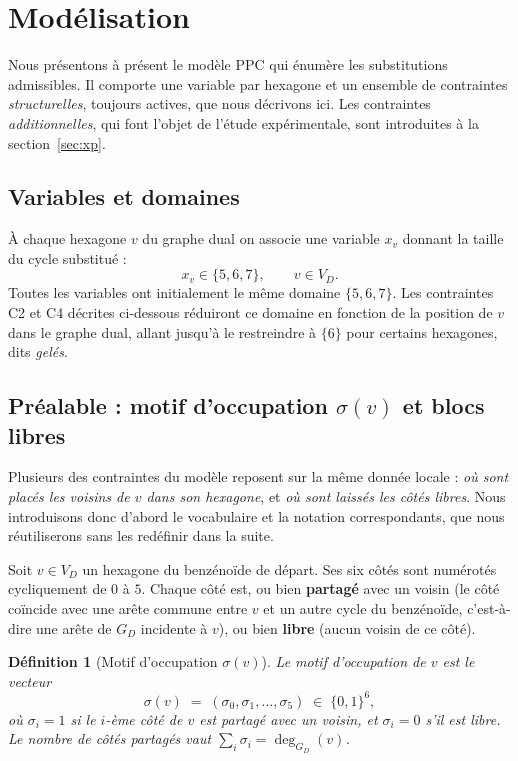 \documentclass[11pt,a4paper]{article}
\newcommand{\GD}{\ensuremath{G_D}}                 %
\newtheorem{definition}{Définition}
\begin{document}
\section{Modélisation}
\label{sec:modele}

Nous présentons à présent le modèle PPC qui énumère les substitutions
admissibles. Il comporte une variable par hexagone et un ensemble de contraintes
\emph{structurelles}, toujours actives, que nous décrivons ici. Les contraintes
\emph{additionnelles}, qui font l'objet de l'étude expérimentale, sont
introduites à la section~\ref{sec:xp}.

\subsection{Variables et domaines}

À chaque hexagone $v$ du graphe dual on associe une variable $x_v$ donnant
la taille du cycle substitué :
\[
  x_v \in \{5, 6, 7\}, \qquad v \in V_D.
\]
Toutes les variables ont initialement le même domaine $\{5, 6, 7\}$.
Les contraintes C2 et C4 décrites ci-dessous réduiront ce domaine
en fonction de la position de $v$ dans le graphe dual, allant jusqu'à
le restreindre à $\{6\}$ pour certains hexagones, dits \emph{gelés}.

\subsection{Préalable : motif d'occupation $\sigma(v)$ et blocs libres}
\label{sec:sigma}

Plusieurs des contraintes du modèle reposent sur la même donnée locale :
\emph{où sont placés les voisins de $v$ dans son hexagone}, et
\emph{où sont laissés les côtés libres}. Nous introduisons donc d'abord
le vocabulaire et la notation correspondants, que nous réutiliserons
sans les redéfinir dans la suite.

Soit $v \in V_D$ un hexagone du benzénoïde de départ. Ses six côtés sont
numérotés cycliquement de $0$ à $5$. Chaque côté est, ou bien
\textbf{partagé} avec un voisin (le côté coïncide avec une arête commune
entre $v$ et un autre cycle du benzénoïde, c'est-à-dire une arête de
$\GD$ incidente à $v$), ou bien \textbf{libre} (aucun voisin de ce côté).

\begin{definition}[Motif d'occupation $\sigma(v)$]
Le \emph{motif d'occupation} de $v$ est le vecteur
\[
  \sigma(v) \;=\; (\sigma_0, \sigma_1, \dots, \sigma_5) \;\in\; \{0, 1\}^6 ,
\]
où $\sigma_i = 1$ si le $i$-ème côté de $v$ est partagé avec un voisin,
et $\sigma_i = 0$ s'il est libre. Le nombre de côtés partagés vaut
$\sum_i \sigma_i = \deg_{\GD}(v)$.
\end{definition}
\end{document}
